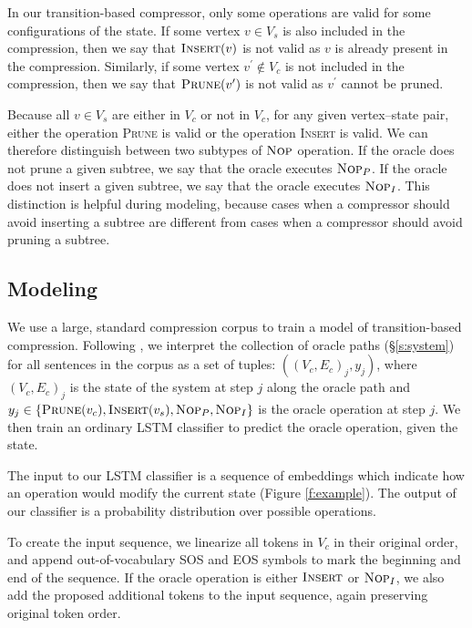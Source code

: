\documentclass[11pt,a4paper]{article}
\begin{document}
In our transition-based compressor, only some operations are valid for some configurations of the state. If some vertex $v \in V_s$ is also included in the compression, then we say that $\textsc{Insert}(v)$ is not valid as $v$ is already present in the compression. Similarly, if some vertex $v^{\prime} \notin V_c$ is not included in the compression, then we say that $\textsc{Prune}(v^{\prime})$ is not valid as $v^{\prime}$ cannot be pruned.

Because all $v \in V_s$ are either in $V_c$ or not in $V_c$, for any given vertex--state pair, either the operation \textsc{Prune} is valid or the operation \textsc{Insert} is valid. We can therefore distinguish between two subtypes of $\textsc{Nop}$ operation. If the oracle does not prune a given subtree, we say that the oracle executes $\textsc{Nop}_P$. If the oracle does not insert a given subtree, we say that the oracle executes $\textsc{Nop}_I$. This distinction is helpful during modeling, because cases when a compressor should avoid inserting a subtree are different from cases when a compressor should avoid pruning a subtree.

\subsection{Modeling}\label{s:modeling}

We use a large, standard compression corpus \cite{filippova2013overcoming} to train a model of transition-based compression. Following \citet{D14-1082}, we interpret the collection of oracle paths (\S\ref{s:system}) for all sentences in the corpus as a set of tuples: ${((V_c,E_c)_j, y_j)}$, where $(V_c,E_c)_j$ is the state of the system at step $j$ along the oracle path and $y_j \in  \{ \textsc{Prune}(v_c), \textsc{Insert}(v_s), \textsc{Nop}_P, \textsc{Nop}_I \}$ is the oracle operation at step $j$. We then train an ordinary LSTM classifier to predict the oracle operation, given the state. 

The input to our LSTM classifier is a sequence of embeddings which indicate how an operation would modify the current state (Figure \ref{f:example}). The output of our classifier is a probability distribution over possible operations.

To create the input sequence, we linearize all tokens in $V_c$ in their original order, and append out-of-vocabulary SOS and EOS symbols to mark the beginning and end of the sequence. If the oracle operation is either $\textsc{Insert}$ or $\textsc{Nop}_I$, we also add the proposed additional tokens to the input sequence, again preserving original token order.
\end{document}
